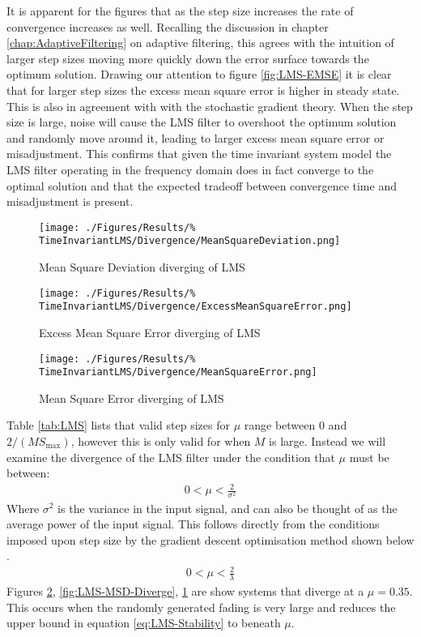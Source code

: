 It is apparent for the figures that as the step size increases the %
rate of convergence increases as well. Recalling the discussion in %
chapter \ref{chap:AdaptiveFiltering} on adaptive filtering, this %
agrees with the intuition of larger step sizes moving more quickly %
down the error surface towards the optimum solution. %
Drawing our attention to figure \ref{fig:LMS-EMSE} it is clear that %
for larger step sizes the excess mean square error is higher %
in steady state. This is also in agreement with with the stochastic %
gradient theory\cite{Hay02}. When the step size is large, noise %
will cause the LMS filter to overshoot the optimum solution %
and randomly move around it, leading to larger excess mean square %
error or misadjustment. This confirms that given the time invariant %
system model the LMS filter operating in the frequency domain does %
in fact converge to the optimal solution and that %
the expected tradeoff between convergence time and misadjustment is %
present.
\begin{figure}[ht]
	\centering
	\begin{minipage}{0.49\textwidth}
		\texttt{[image: ./Figures/Results/\%
		TimeInvariantLMS/Divergence/MeanSquareDeviation.png]}
		\captionsetup{width=0.75\linewidth}
		\caption{Mean Square Deviation diverging of LMS}
		\label{fig:LMS-MSD-Diverge}
	\end{minipage}
	\begin{minipage}{0.49\textwidth}
		\texttt{[image: ./Figures/Results/\%
		TimeInvariantLMS/Divergence/ExcessMeanSquareError.png]}
		\captionsetup{width=0.75\linewidth}
		\caption{Excess Mean Square Error diverging of LMS}
		\label{fig:LMS-EMSE-Diverge}
	\end{minipage}
\end{figure}
\begin{figure}[ht]
	\centering
	\texttt{[image: ./Figures/Results/\%
	TimeInvariantLMS/Divergence/MeanSquareError.png]}
	\captionsetup{width=0.75\linewidth}
	\caption{Mean Square Error diverging of LMS}
	\label{fig:LMS-MSE-Diverge}
\end{figure}
Table \ref{tab:LMS} lists that valid step sizes for $\mu$ range %
between $0$ and $2/(M S_{\text{max}})$, however %
this is only valid for when $M$ is large. Instead we will %
examine the divergence of the LMS filter under the %
condition that $\mu$ must be between:
\begin{align}
	0 < \mu < \frac{2}{\sigma^{2}}
	\label{eq:LMS-Stability}
\end{align}
Where $\sigma^{2}$ is the variance in the input signal, and can also %
be thought of as the average power of the input signal. This follows %
directly from the conditions imposed upon step size by the gradient %
descent optimisation method shown below \cite{Hay02}.
\begin{align}
	0 < \mu < \frac{2}{\lambda}
\end{align}
Figures \ref{fig:LMS-MSE-Diverge}, %
\ref{fig:LMS-MSD-Diverge}, \ref{fig:LMS-EMSE-Diverge} are %
show systems that diverge at a $\mu = 0.35$. This occurs %
when the randomly generated fading is very large and reduces %
the upper bound in equation \ref{eq:LMS-Stability} to beneath %
$\mu$.
\FloatBarrier
